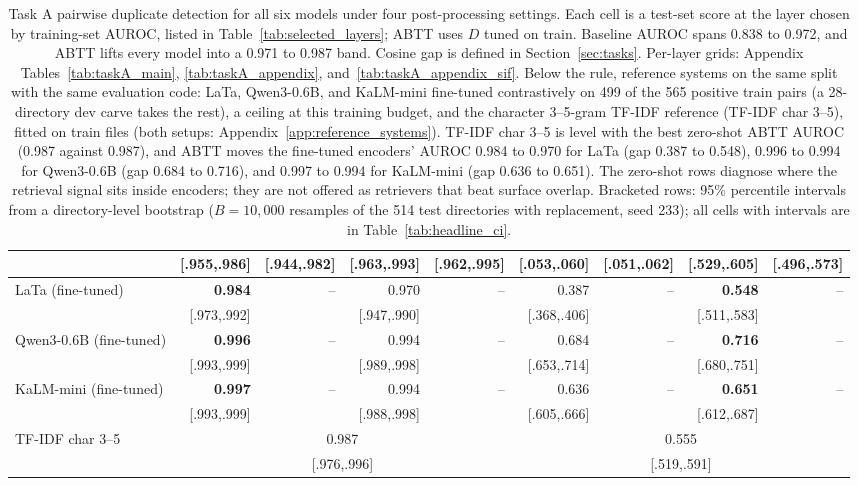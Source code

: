 \begin{table}[t]
\begin{tabular}{lrrrrrrrr}
 & {\scriptsize [.955,.986]} & {\scriptsize [.944,.982]} & {\scriptsize [.963,.993]} & {\scriptsize [.962,.995]} & {\scriptsize [.053,.060]} & {\scriptsize [.051,.062]} & {\scriptsize [.529,.605]} & {\scriptsize [.496,.573]} \\
\midrule
LaTa (fine-tuned) & \textbf{0.984} & -- & 0.970 & -- & 0.387 & -- & \textbf{0.548} & -- \\
 & {\scriptsize [.973,.992]} &  & {\scriptsize [.947,.990]} &  & {\scriptsize [.368,.406]} &  & {\scriptsize [.511,.583]} &  \\
Qwen3-0.6B (fine-tuned) & \textbf{0.996} & -- & 0.994 & -- & 0.684 & -- & \textbf{0.716} & -- \\
 & {\scriptsize [.993,.999]} &  & {\scriptsize [.989,.998]} &  & {\scriptsize [.653,.714]} &  & {\scriptsize [.680,.751]} &  \\
KaLM-mini (fine-tuned) & \textbf{0.997} & -- & 0.994 & -- & 0.636 & -- & \textbf{0.651} & -- \\
 & {\scriptsize [.993,.999]} &  & {\scriptsize [.988,.998]} &  & {\scriptsize [.605,.666]} &  & {\scriptsize [.612,.687]} &  \\
TF-IDF char 3--5 & \multicolumn{4}{c}{0.987} & \multicolumn{4}{c}{0.555} \\
 & \multicolumn{4}{c}{{\scriptsize [.976,.996]}} & \multicolumn{4}{c}{{\scriptsize [.519,.591]}} \\
\bottomrule
\end{tabular}
\caption{Task A pairwise duplicate detection for all six models under four post-processing settings. Each cell is a test-set score at the layer chosen by training-set AUROC, listed in Table~\ref{tab:selected_layers}; ABTT uses $D$ tuned on train. Baseline AUROC spans 0.838 to 0.972, and ABTT lifts every model into a 0.971 to 0.987 band. Cosine gap is defined in Section~\ref{sec:tasks}. Per-layer grids: Appendix Tables~\ref{tab:taskA_main}, \ref{tab:taskA_appendix}, and~\ref{tab:taskA_appendix_sif}. Below the rule, reference systems on the same split with the same evaluation code: LaTa, Qwen3-0.6B, and KaLM-mini fine-tuned contrastively on 499 of the 565 positive train pairs (a 28-directory dev carve takes the rest), a ceiling at this training budget, and the character 3--5-gram TF-IDF reference (TF-IDF char 3--5), fitted on train files (both setups: Appendix~\ref{app:reference_systems}). TF-IDF char 3--5 is level with the best zero-shot ABTT AUROC (0.987 against 0.987), and ABTT moves the fine-tuned encoders' AUROC 0.984 to 0.970 for LaTa (gap 0.387 to 0.548), 0.996 to 0.994 for Qwen3-0.6B (gap 0.684 to 0.716), and 0.997 to 0.994 for KaLM-mini (gap 0.636 to 0.651). The zero-shot rows diagnose where the retrieval signal sits inside encoders; they are not offered as retrievers that beat surface overlap. Bracketed rows: 95\% percentile intervals from a directory-level bootstrap ($B=10{,}000$ resamples of the 514 test directories with replacement, seed 233); all cells with intervals are in Table~\ref{tab:headline_ci}.}
\label{tab:taskA_headline}
\end{table}
